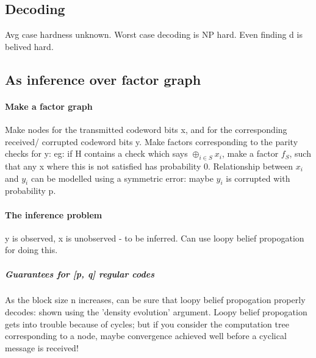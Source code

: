 \documentclass[oneside, article]{memoir}
\begin{document}
\subsection{Decoding}
Avg case hardness unknown. Worst case decoding is NP hard. Even finding d is belived hard.

\subsection{As inference over factor graph}
\paragraph*{Make a factor graph}
Make nodes for the transmitted codeword bits x, and for the corresponding received/ corrupted codeword bits y. Make factors corresponding to the parity checks for y: eg: if H contains a check which says $\oplus_{i \in S} x_i$, make a factor $f_S$, such that any x where this is not satisfied has probability 0. Relationship between $x_i$ and $y_i$ can be modelled using a symmetric error: maybe $y_i$ is corrupted with probability p.

\paragraph*{The inference problem}
y is observed, x is unobserved - to be inferred. Can use loopy belief propogation for doing this.

\subparagraph*{Guarantees for [p, q] regular codes}
As the block size n increases, can be sure that loopy belief propogation properly decodes: shown using the 'density evolution' argument. Loopy belief propogation gets into trouble because of cycles; but if you consider the computation tree corresponding to a node, maybe convergence achieved well before a cyclical message is received!
\end{document}
